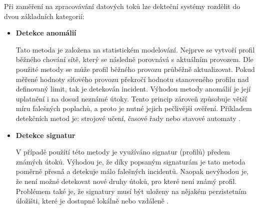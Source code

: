  Při zaměření na zpracovávání datových toků lze dekteční systémy rozdělit do dvou základních kategorií:
 \begin{itemize}
  \item \textbf{Detekce anomálií}
  
  Tato metoda je založena na statistickém modelování. Nejprve se vytvoří profil běžného chování sítě, 
  který se následně porovnává s aktuálním provozem. Dle použité metody se může profil běžného provozu
  průběžně aktualizovat. Pokud měřené hodnoty síťového provozu překročí hodnotu stanoveného profilu
  nad definovaný limit, tak je detekován incident. Výhodou metody anomálií je její uplatnění i na 
  dosud neznámé útoky. Tento princip zároveň způsobuje větší míru falešných poplachů, a proto 
  je nutné jejich pečlivější ověření. Příkladem detekčních metod je: strojové učení, časové řady nebo
  stavové automaty \cite{ids-ips}.
  
  \item \textbf{Detekce signatur}
  
  V případě použítí této metody je využíváno signatur (profilů) předem známých útoků. Výhodou je, že díky 
  popsaným signaturám je tato metoda poměrně přesná a detekuje málo falešných incidentů. Naopak
  nevýhodou je, že není možné detekovat nové druhy útoků, pro které není známý profil. Problémem
  také je, že signatury musí být uloženy na nějakém perzistetním úložišti, které je dostupné 
  lokálně nebo vzdáleně \cite{ids-ips}.
 \end{itemize}
 
